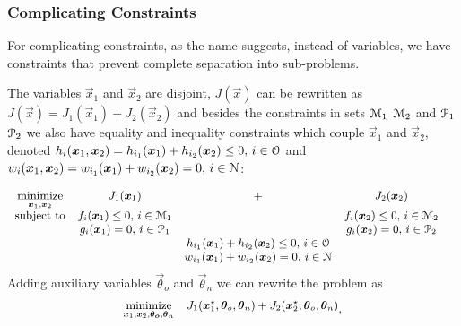 \documentclass[../main.tex]{subfiles}
\begin{document}
\subsubsection{Complicating Constraints}

For complicating constraints, as the name suggests, instead of variables, we have constraints that prevent complete separation into sub-problems.

The variables $\vec{x}_{1}$ and $\vec{x}_{2}$ are disjoint, $J(\vec{x})$ can be rewritten as ${J(\vec{x})=J_{1}(\vec{x}_{1})+J_{2}(\vec{x}_{2})}$ and besides the constraints in sets $\mathcal{M}_{1}$ $\mathcal{M}_{2}$ and $\mathcal{P}_{1}$ $\mathcal{P}_{2}$ we also have equality and inequality constraints which couple $\vec{x}_{1}$ and $\vec{x}_{2}$, denoted ${h_{i}(\boldsymbol{x}_{1},\boldsymbol{x}_{2})=h_{i_{1}}(\boldsymbol{x}_{1})+h_{i_{2}}(\boldsymbol{x}_{2}) \leq 0\text{, }i\in\mathcal{O}}$
and ${w_{i}(\boldsymbol{x}_{1},\boldsymbol{x}_{2})=w_{i_{1}}(\boldsymbol{x}_{1})+w_{i_{2}}(\boldsymbol{x}_{2}) =0\text{, }i\in\mathcal{N}}$:

\begin{equation}\label{eq:general_complicating_constraints_optimization_problem}
  \small
  \begin{aligned}
    \begin{matrix}
      \mathop{\textrm{minimize}}\limits_{\boldsymbol{x}_{1},\boldsymbol{x}_{2}}  &J_{1}(\boldsymbol{x}_{1})&+&J_{2}(\boldsymbol{x}_{2})&\\
      \mathrm{subject~ to} &

           f_{i}(\boldsymbol{x}_{1}) \leq 0 \text{, } i\in\mathcal{M}_{1}& & f_{i}(\boldsymbol{x}_{2}) \leq 0 \text{, } i\in\mathcal{M}_{2}\\
          & g_{i}(\boldsymbol{x}_{1}) = 0\text{, } i\in\mathcal{P}_{1}& & g_{i}(\boldsymbol{x}_{2}) = 0\text{, } i\in\mathcal{P}_{2}\\
          && h_{i_{1}}(\boldsymbol{x}_{1})+h_{i_{2}}(\boldsymbol{x}_{2}) \leq 0\text{, } i\in\mathcal{O}\\
          &&w_{i_{1}}(\boldsymbol{x}_{1})+w_{i_{2}}(\boldsymbol{x}_{2}) = 0\text{, }  i\in\mathcal{N}

    \end{matrix}
  \end{aligned}
\end{equation}
Adding auxiliary variables $\vec{\theta}_{o}$ and $\vec{\theta}_{n}$ we can rewrite the problem as
\begin{equation}\label{eq:general_complicating_constraints_optimization_main_problem}
  \small
  \begin{aligned}
    \begin{matrix}
      \mathop{\textrm{minimize}}\limits_{\boldsymbol{x}_{1},\boldsymbol{x}_{2},\boldsymbol{\theta_{o}},\boldsymbol{\theta}_{n}}  &J_{1}(\boldsymbol{x}_{1}^{\star},\boldsymbol{\theta}_{o},\boldsymbol{\theta}_{n})+J_{2}(\boldsymbol{x}_{2}^{\star},\boldsymbol{\theta}_{o},\boldsymbol{\theta}_{n})
    \end{matrix}
  \end{aligned},
\end{equation}
\end{document}
